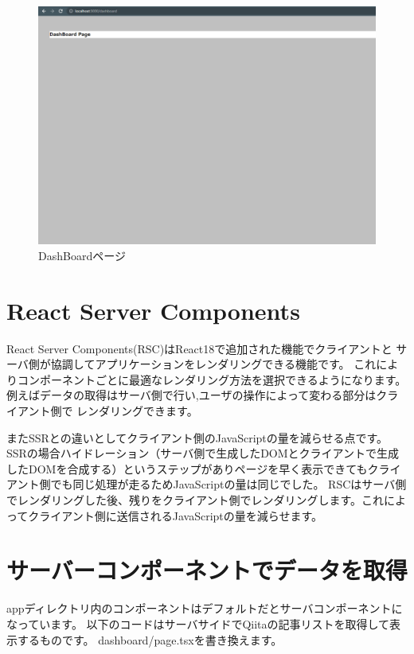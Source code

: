 \begin{figure}[H]
  \centering
  \includegraphics[width=12cm]{./image/03-Tech/chap4/03.png}
  \caption{DashBoardページ}
\end{figure}










\section{React Server Components}
React Server Components(RSC)はReact18で追加された機能でクライアントと
サーバ側が協調してアプリケーションをレンダリングできる機能です。
これによりコンポーネントごとに最適なレンダリング方法を選択できるようになります。
例えばデータの取得はサーバ側で行い,ユーザの操作によって変わる部分はクライアント側で
レンダリングできます。



またSSRとの違いとしてクライアント側のJavaScriptの量を減らせる点です。
SSRの場合ハイドレーション（サーバ側で生成したDOMとクライアントで生成したDOMを合成する）というステップがありページを早く表示できてもクライアント側でも同じ処理が走るためJavaScriptの量は同じでした。
RSCはサーバ側でレンダリングした後、残りをクライアント側でレンダリングします。これによってクライアント側に送信されるJavaScriptの量を減らせます。


\section{サーバーコンポーネントでデータを取得}


appディレクトリ内のコンポーネントはデフォルトだとサーバコンポーネントになっています。
以下のコードはサーバサイドでQiitaの記事リストを取得して表示するものです。
dashboard/page.tsxを書き換えます。



